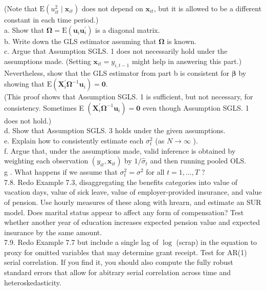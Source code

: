 \documentclass[10pt]{article}
\begin{document}
(Note that $\mathrm{E}\left(u_{i t}^{2} \mid \mathbf{x}_{i t}\right)$ does not depend on $\mathbf{x}_{i t}$, but it is allowed to be a different constant in each time period.)\\
a. Show that $\boldsymbol{\Omega}=\mathrm{E}\left(\mathbf{u}_{i} \mathbf{u}_{i}^{\prime}\right)$ is a diagonal matrix.\\
b. Write down the GLS estimator assuming that $\boldsymbol{\Omega}$ is known.\\
c. Argue that Assumption SGLS. 1 does not necessarily hold under the assumptions made. (Setting $\mathbf{x}_{i t}=y_{i, t-1}$ might help in answering this part.) Nevertheless, show that the GLS estimator from part b is consistent for $\boldsymbol{\beta}$ by showing that $\mathrm{E}\left(\mathbf{X}_{i}^{\prime} \boldsymbol{\Omega}^{-1} \mathbf{u}_{i}\right)=\mathbf{0}$.\\
(This proof shows that Assumption SGLS. 1 is sufficient, but not necessary, for consistency. Sometimes E $\left(\mathbf{X}_{i}^{\prime} \boldsymbol{\Omega}^{-1} \mathbf{u}_{i}\right)=\mathbf{0}$ even though Assumption SGLS. 1 does not hold.)\\
d. Show that Assumption SGLS. 3 holds under the given assumptions.\\
e. Explain how to consistently estimate each $\sigma_{t}^{2}$ (as $N \rightarrow \infty$ ).\\
f. Argue that, under the assumptions made, valid inference is obtained by weighting each observation $\left(y_{i t}, \mathbf{x}_{i t}\right)$ by $1 / \hat{\sigma}_{t}$ and then running pooled OLS.\\
g . What happens if we assume that $\sigma_{t}^{2}=\sigma^{2}$ for all $t=1, \ldots, T$ ?\\
7.8. Redo Example 7.3, disaggregating the benefits categories into value of vacation days, value of sick leave, value of employer-provided insurance, and value of pension. Use hourly measures of these along with hrearn, and estimate an SUR model. Does marital status appear to affect any form of compensation? Test whether another year of education increases expected pension value and expected insurance by the same amount.\\
7.9. Redo Example 7.7 but include a single lag of $\log$ (scrap) in the equation to proxy for omitted variables that may determine grant receipt. Test for AR(1) serial correlation. If you find it, you should also compute the fully robust standard errors that allow for abitrary serial correlation across time and heteroskedasticity.\\
\end{document}

